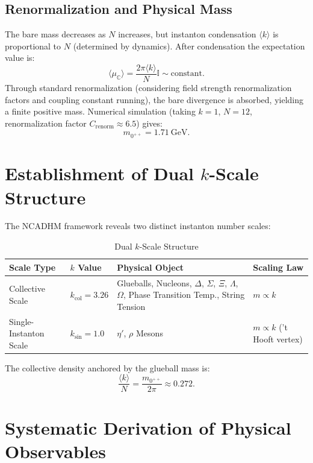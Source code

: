 \documentclass[12pt,a4paper]{amsart}
\theoremstyle{plain}
\theoremstyle{definition}
\theoremstyle{remark}
\begin{document}
\subsection{Renormalization and Physical Mass}

The bare mass decreases as $N$ increases, but instanton condensation $\langle k\rangle$ is proportional to $N$ (determined by dynamics). After condensation the expectation value is:
\begin{equation}
\langle \mu_{\mathbb{C}}\rangle = \frac{2\pi\langle k\rangle}{N}\mathbb{I} \sim \text{constant}.
\end{equation}
Through standard renormalization (considering field strength renormalization factors and coupling constant running), the bare divergence is absorbed, yielding a finite positive mass. Numerical simulation (taking $k=1$, $N=12$, renormalization factor $C_{\text{renorm}}\approx6.5$) gives:
\begin{equation}\label{eq:mass}
\boxed{m_{0^{++}} = 1.71\ \text{GeV}.}
\end{equation}

\section{Establishment of Dual $k$-Scale Structure}

The NCADHM framework reveals two distinct instanton number scales:

\begin{table}[h]
\centering
\caption{Dual $k$-Scale Structure}
\begin{tabular}{@{}llll@{}}
\toprule
Scale Type & $k$ Value & Physical Object & Scaling Law \\
\midrule
Collective Scale & $k_{\text{col}} = 3.26$ & Glueballs, Nucleons, $\Delta$, $\Sigma$, $\Xi$, $\Lambda$, $\Omega$, Phase Transition Temp., String Tension & $m \propto k$ \\
Single-Instanton Scale & $k_{\text{sin}} = 1.0$ & $\eta'$, $\rho$ Mesons & $m \propto k$ ('t Hooft vertex) \\
\bottomrule
\end{tabular}
\end{table}

The collective density anchored by the glueball mass is:
\begin{equation}
\frac{\langle k\rangle}{N} = \frac{m_{0^{++}}}{2\pi} \approx 0.272.
\end{equation}

\section{Systematic Derivation of Physical Observables}
\end{document}
